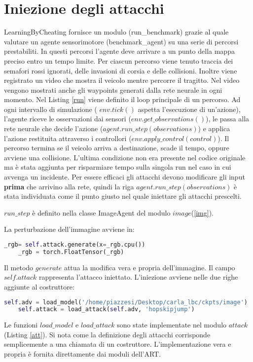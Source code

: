 \section{Iniezione degli attacchi}
LearningByCheating fornisce un modulo (run\_benchmark) grazie al quale valutare un agente sensorimotore (benchmark\_agent) su una serie di percorsi prestabiliti.
In questi percorsi l'agente deve arrivare a un punto della mappa preciso entro un tempo limite. Per ciascun percorso viene tenuto traccia dei semafori rossi ignorati, delle invasioni di corsia e delle collisioni. Inoltre viene registrato un video che mostra il veicolo mentre percorre il tragitto.
Nel video vengono mostrati anche gli waypoints generati dalla rete neurale in ogni momento. Nel Listing \ref{run} viene definito il loop principale di un percorso.
Ad ogni intervallo di simulazione ( $env.tick()$ aspetta l'esecuzione di un'azione),  l'agente riceve le osservazioni dai sensori ($env.get\_observations()$), le passa alla 
rete neurale che decide l'azione ($agent.run\_step(observations)$) e applica l'azione restituita attraverso i controllori ($env.apply\_control(control)$). Il percorso termina 
se il veicolo arriva a destinazione, scade il tempo, oppure avviene una collisione. L'ultima condizione non era presente nel codice originale ma è stata aggiunta per risparmiare tempo sulla singola run nel caso in cui avvenga un incidente. Per essere efficaci gli attacchi devono modificare gli input 
\textbf{prima} che arrivino alla rete, quindi la riga $agent.run\_step(observations)$ è stata individuata come il punto giusto nel quale iniettare gli attacchi prescelti.

$run\_step$ è definito nella classe ImageAgent del  modulo $image$(\ref{img}).

La perturbazione dell'immagine avviene in:
\begin{lstlisting}[language=Python]
    _rgb= self.attack.generate(x=_rgb.cpu())
    _rgb = torch.FloatTensor(_rgb)
\end{lstlisting}
Il metodo $generate$ attua la modifica vera e propria dell'immagine. Il campo $self.attack$ rappresenta l'attacco iniettato. L'iniezione avviene nelle due righe aggiunte al costruttore:
\begin{lstlisting}[language=Python]
    self.adv = load_model('/home/piazzesi/Desktop/carla_lbc/ckpts/image')
    self.attack = load_attack(self.adv, 'hopskipjump')
\end{lstlisting}
Le funzioni $load\_model$ e $load\_attack$ sono state implementate nel modulo $attack$ (Listing \ref{att}). Si nota come la definizione  degli attacchi corrisponde semplicemente a una chiamata
di un costruttore. L'implementazione vera e propria  è fornita direttamente dai moduli dell'ART.

